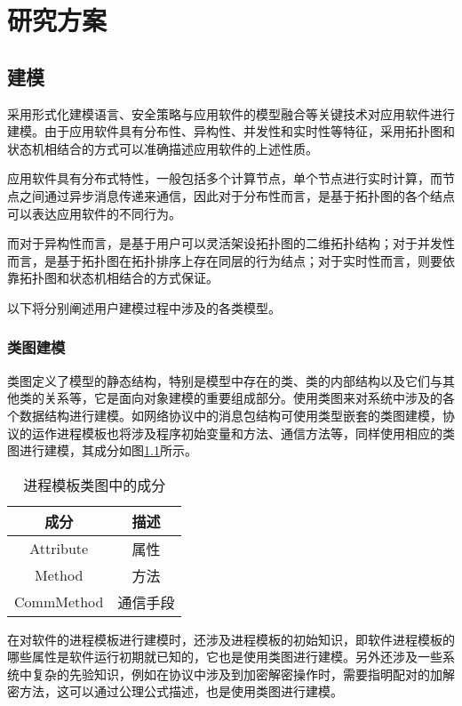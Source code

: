 \chapter{研究方案}

\section{建模}
采用形式化建模语言、安全策略与应用软件的模型融合等关键技术对应用软件进行建模。由于应用软件具有分布性、异构性、并发性和实时性等特征，采用拓扑图和状态机相结合的方式可以准确描述应用软件的上述性质。
\par
应用软件具有分布式特性，一般包括多个计算节点，单个节点进行实时计算，而节点之间通过异步消息传递来通信，因此对于分布性而言，是基于拓扑图的各个结点可以表达应用软件的不同行为。
\par
而对于异构性而言，是基于用户可以灵活架设拓扑图的二维拓扑结构；对于并发性而言，是基于拓扑图在拓扑排序上存在同层的行为结点；对于实时性而言，则要依靠拓扑图和状态机相结合的方式保证。
\par
以下将分别阐述用户建模过程中涉及的各类模型。

\subsection{类图建模}
类图定义了模型的静态结构，特别是模型中存在的类、类的内部结构以及它们与其他类的关系等，它是面向对象建模的重要组成部分。使用类图来对系统中涉及的各个数据结构进行建模。如网络协议中的消息包结构可使用类型嵌套的类图建模，协议的运作进程模板也将涉及程序初始变量和方法、通信方法等，同样使用相应的类图进行建模，其成分如图\ref{process}所示。
\begin{table}[h]
	\centering
	\begin{tabular}{|c|c|}
		\hline
		\textbf{成分} & \textbf{描述} \\ \hline
		Attribute           & 属性          \\ \hline
		Method              & 方法          \\ \hline
		CommMethod          & 通信手段        \\ \hline
	\end{tabular}
	\caption{进程模板类图中的成分}
	\label{process}
\end{table}

在对软件的进程模板进行建模时，还涉及进程模板的初始知识，即软件进程模板的哪些属性是软件运行初期就已知的，它也是使用类图进行建模。另外还涉及一些系统中复杂的先验知识，例如在协议中涉及到加密解密操作时，需要指明配对的加解密方法，这可以通过公理公式描述，也是使用类图进行建模。

